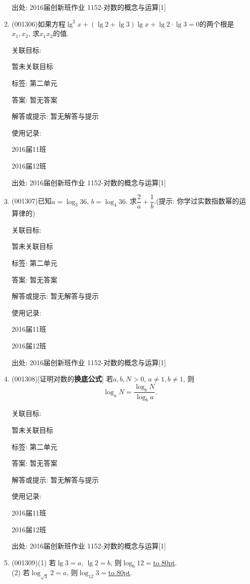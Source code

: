 \documentclass[10pt,a4paper]{article}
\newcommand{\blank}[1]{\underline{\hbox to #1pt{}}}
\begin{document}
\begin{enumerate}[1.]
出处: 2016届创新班作业	1152-对数的概念与运算[1]
\item { (001306)}如果方程$\lg^2x+(\lg2+\lg3)\lg x+\lg2\cdot\lg3=0$的两个根是$x_1,x_2$, 求$x_1x_2$的值.


关联目标:

暂未关联目标



标签: 第二单元

答案: 暂无答案

解答或提示: 暂无解答与提示

使用记录:

2016届11班	

2016届12班	


出处: 2016届创新班作业	1152-对数的概念与运算[1]
\item { (001307)}已知$a=\log_3 36$, $b=\log_4 36$. 求$\dfrac{2}{a}+\dfrac{1}{b}$.(提示: 你学过实数指数幂的运算律的)


关联目标:

暂未关联目标



标签: 第二单元

答案: 暂无答案

解答或提示: 暂无解答与提示

使用记录:

2016届11班	

2016届12班	


出处: 2016届创新班作业	1152-对数的概念与运算[1]
\item { (001308)}[证明对数的{\bf 换底公式}]
若$a,b,N>0$, $a\ne 1, b\ne 1$, 则
$$\log_aN=\dfrac{\log_b N}{\log_b a}.$$


关联目标:

暂未关联目标



标签: 第二单元

答案: 暂无答案

解答或提示: 暂无解答与提示

使用记录:

2016届11班	

2016届12班	


出处: 2016届创新班作业	1152-对数的概念与运算[1]
\item { (001309)}(1) 若$\lg 3=a$, $\lg 2=b$, 则$\log_6 12=$\blank{80}.\\ 
(2) 若$\log_{\sqrt{3}} 2=a$, 则$\log_{12} 3=$\blank{80}.



\end{enumerate}
\end{document}
